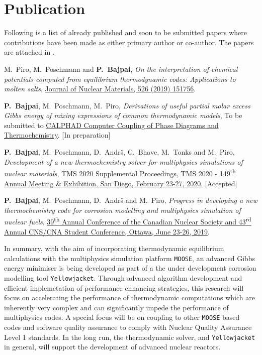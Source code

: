 \section*{Publication}
Following is a list of already published and soon to be submitted papers where contributions have been made as either primary author or co-author. The papers are attached in . 

\begin{enumerate}{\small
\item {M.\ Piro}, {M.\ Poschmann} and \textbf{P.\ Bajpai}, \textit{On the interpretation of chemical potentials computed from equilibrium thermodynamic codes: Applications to molten salts}, \href{https://doi.org/10.1016/j.jnucmat.2019.151756}{Journal of Nuclear Materials, 526 (2019) 151756}.
\item \textbf{P.\ Bajpai}, {M.\ Poschmann}, {M.\ Piro}, \textit{Derivations of useful partial molar excess Gibbs energy of mixing expressions of common thermodynamic models}, To be submitted to \href{https://www.journals.elsevier.com/calphad}{CALPHAD Computer Coupling of Phase Diagrams and Thermochemistry}. [In preparation]
\item \textbf{P.\ Bajpai}, {M.\ Poschmann}, {D.\ Andr\v{s}}, {C.\ Bhave}, {M.\ Tonks} and {M.\ Piro}, \textit{Development of a new thermochemistry solver for multiphysics simulations of nuclear materials}, \href{http://https://www.tms.org/TMS2020}{TMS 2020 Supplemental Proceedings, TMS 2020  - 149\textsuperscript{th} Annual Meeting \& Exhibition, San Diego, February 23-27, 2020}. [Accepted]
\item \textbf{P.\ Bajpai}, {M.\ Poschmann}, {D.\ Andr\v{s}} and {M.\ Piro}, \textit{Progress in developing a new thermochemistry code for corrosion modelling and multiphysics simulation of nuclear fuels}, \href{http://cns-annual-conference.org/2019/index.html}{39\textsuperscript{th} Annual Conference of the Canadian Nuclear Society and 43\textsuperscript{rd} Annual CNS/CNA Student Conference, Ottawa, June 23-26, 2019}.
}\end{enumerate}

In summary, with the aim of incorporating thermodynamic equilibrium calculations with the multiphysics simulation platform \texttt{MOOSE}, an advanced Gibbs energy minimiser is being developed as part of a the under development corrosion modelling tool \texttt{Yellowjacket}. Through advanced algorithm development and efficient implemetation of performance enhancing strategies, this research will focus on accelerating the performance of thermodynamic computations which are inherently very complex and can significantly impede the performance of multiphysics codes. A special focus will be on coupling to other \texttt{MOOSE} based codes and software quality assurance to comply with Nuclear Quality Assurance Level 1 standards. In the long run, the thermodynamic solver, and \texttt{Yellowjacket} in general, will support the development of advanced nuclear reactors.
